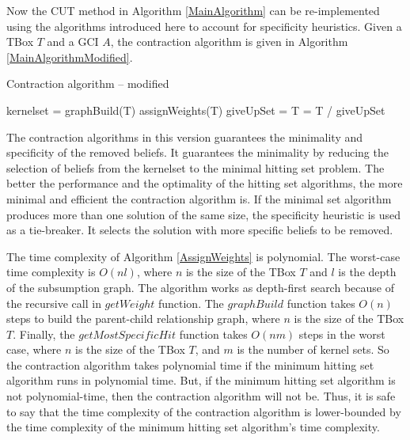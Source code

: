 Now the CUT method in Algorithm \ref{MainAlgorithm} can be re-implemented using the algorithms introduced here to account for specificity heuristics. Given a TBox $T$ and a GCI $A$, the contraction algorithm is given in Algorithm \ref{MainAlgorithmModified}.

\begin{algorithm}
\caption{Contraction algorithm -- modified}
\label{MainAlgorithmModified}
\begin{algorithmic}[1]
\State kernelset = 
\State graphBuild(T)
\State assignWeights(T)
\State giveUpSet = 
\State T = T / giveUpSet
\EndProcedure
\end{algorithmic}
\end{algorithm}

The contraction algorithms in this version guarantees the minimality and specificity of the removed beliefs. It guarantees the minimality by reducing the selection of beliefs from the kernelset to the minimal hitting set problem. The better the performance and the optimality of the hitting set algorithms, the more minimal and efficient the contraction algorithm is. If the minimal set algorithm produces more than one solution of the same size, the specificity heuristic is used as a tie-breaker. It selects the solution with more specific beliefs to be removed.

The time complexity of Algorithm \ref{AssignWeights} is polynomial. The worst-case time complexity is $O(nl)$, where $n$ is the size of the TBox $T$ and $l$ is the depth of the subsumption graph. The algorithm works as depth-first search because of the recursive call in $getWeight$ function. The $graphBuild$ function takes $O(n)$ steps to build the parent-child relationship graph, where $n$ is the size of the TBox $T$. Finally, the $getMostSpecificHit$ function takes $O(nm)$ steps in the worst case, where $n$ is the size of the TBox $T$, and $m$ is the number of kernel sets. So the contraction algorithm takes polynomial time if the minimum hitting set algorithm runs in polynomial time. But, if the minimum hitting set algorithm is not polynomial-time, then the contraction algorithm will not be. Thus, it is safe to say that the time complexity of the contraction algorithm is lower-bounded by the time complexity of the minimum hitting set algorithm's time complexity.